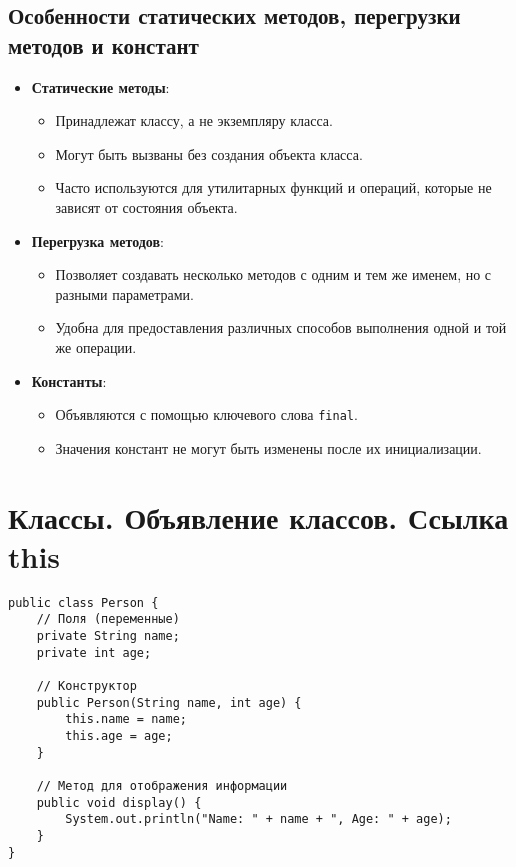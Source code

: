 \documentclass[12pt, a4paper]{article}
\begin{document}
\subsection*{Особенности статических методов, перегрузки методов и констант}
\begin{itemize}
    \item \textbf{Статические методы}:
    \begin{itemize}
        \item Принадлежат классу, а не экземпляру класса.
        \item Могут быть вызваны без создания объекта класса.
        \item Часто используются для утилитарных функций и операций, которые не зависят от состояния объекта.
    \end{itemize}

    \item \textbf{Перегрузка методов}:
    \begin{itemize}
        \item Позволяет создавать несколько методов с одним и тем же именем, но с разными параметрами.
        \item Удобна для предоставления различных способов выполнения одной и той же операции.
    \end{itemize}

    \item \textbf{Константы}:
    \begin{itemize}
        \item Объявляются с помощью ключевого слова \texttt{final}.
        \item Значения констант не могут быть изменены после их инициализации.
    \end{itemize}
\end{itemize}


\section{Классы. Объявление классов. Ссылка this}
\begin{verbatim}
public class Person {
    // Поля (переменные)
    private String name;
    private int age;

    // Конструктор
    public Person(String name, int age) {
        this.name = name;
        this.age = age;
    }

    // Метод для отображения информации
    public void display() {
        System.out.println("Name: " + name + ", Age: " + age);
    }
}
\end{verbatim}
\end{document}
